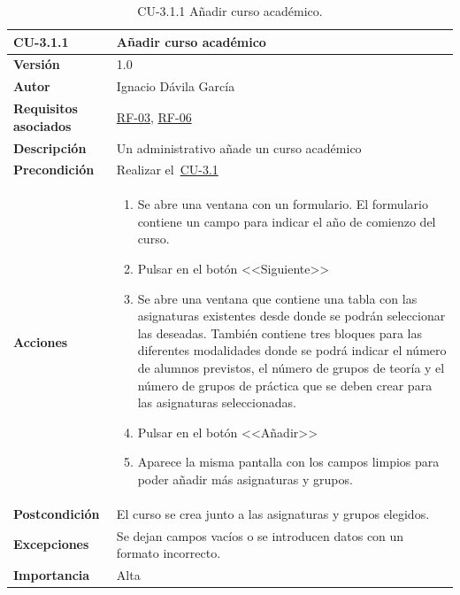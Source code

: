 \begin{table}[p]
\label{table:CU-3.1.1}
	\centering
	\begin{tabularx}{\linewidth}{ p{} p{} }
		\toprule
		\textbf{CU-3.1.1}    & \textbf{Añadir curso académico}\\
		\toprule
		\textbf{Versión}              & 1.0    \\
		\textbf{Autor}                & Ignacio Dávila García \\
		\textbf{Requisitos asociados} & \hyperref[itm:RF3]{RF-03}, \hyperref[itm:RF6]{RF-06} \\
		\textbf{Descripción}          & Un administrativo añade un curso académico \\
		\textbf{Precondición}         & Realizar el~\hyperref[table:CU-3.1]{CU-3.1} \\
		\textbf{Acciones}             &
		\begin{enumerate}
			\def\labelenumi{\arabic{enumi}.}
			\tightlist
			\item Se abre una ventana con un formulario. El formulario contiene un campo para indicar el año de comienzo del curso.
			\item Pulsar en el botón <<Siguiente>>
			\item Se abre una ventana que contiene una tabla con las asignaturas existentes desde donde se podrán seleccionar las deseadas. También contiene tres bloques para las diferentes modalidades donde se podrá indicar el número de alumnos previstos, el número de grupos de teoría y el número de grupos de práctica que se deben crear para las asignaturas seleccionadas.
			\item Pulsar en el botón <<Añadir>>
			\item Aparece la misma pantalla con los campos limpios para poder añadir más asignaturas y grupos.
		\end{enumerate}\\
		\textbf{Postcondición}        & El curso se crea junto a las asignaturas y grupos elegidos. \\
		\textbf{Excepciones}          & Se dejan campos vacíos o se introducen datos con un formato incorrecto. \\
		\textbf{Importancia}          & Alta \\
		\bottomrule
	\end{tabularx}
	\caption{CU-3.1.1 Añadir curso académico.}
\end{table}
\FloatBarrier

